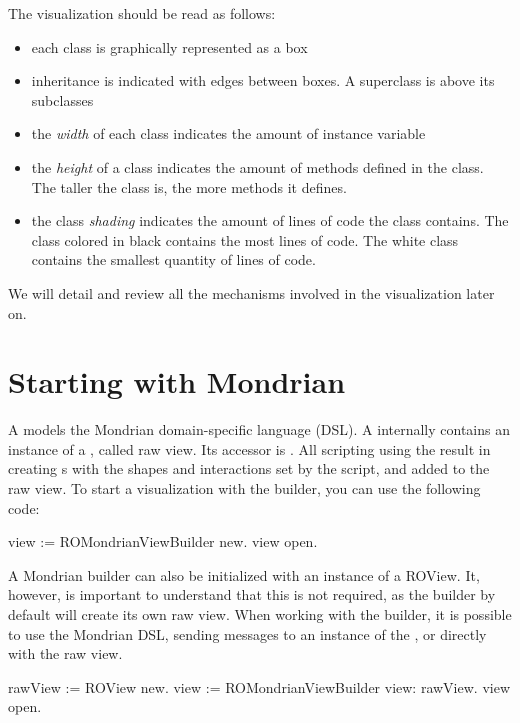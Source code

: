 \documentclass[a4paper,10pt,twoside]{book}
\begin{document}
The visualization should be read as follows:

\begin{itemize}
\item each class is graphically represented as a box
\item inheritance is indicated with edges between boxes. A superclass is above its subclasses
\item the \emph{width} of each class indicates the amount of instance variable 
\item the \emph{height} of a class indicates the amount of methods defined in the class. The taller the class is, the more methods it defines.
\item the class \emph{shading} indicates the amount of lines of code the class contains. The class colored in black contains the most lines of code. The white class contains the smallest quantity of lines of code.
\end{itemize}

We will detail and review all the mechanisms involved in the visualization later on.


\section{Starting with Mondrian}

A  models the Mondrian domain-specific language (DSL).
A  internally contains an instance of a , called raw view. Its accessor is . All scripting  using the  result in creating s with the shapes and interactions set by the script, and added to the raw view. To start a visualization with the builder, you can use the following code:

\begin{code}{}
view := ROMondrianViewBuilder new.
view open.
\end{code}

A Mondrian builder can also be initialized with an instance of a ROView. It, however, is important to understand that this is not required, as the builder by default will create its own raw view.
When working with the builder, it is possible to use the Mondrian DSL, sending messages to an instance of the , or directly with the raw view. 

\begin{code}{}
rawView := ROView new.
view := ROMondrianViewBuilder view: rawView.
view open.
\end{code}
\end{document}
